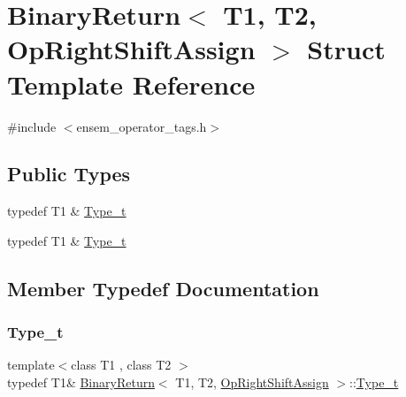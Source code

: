 \hypertarget{structBinaryReturn_3_01T1_00_01T2_00_01OpRightShiftAssign_01_4}{}\section{Binary\+Return$<$ T1, T2, Op\+Right\+Shift\+Assign $>$ Struct Template Reference}
\label{structBinaryReturn_3_01T1_00_01T2_00_01OpRightShiftAssign_01_4}


{\ttfamily \#include $<$ensem\+\_\+operator\+\_\+tags.\+h$>$}

\subsection*{Public Types}
\begin{DoxyCompactItemize}
\item 
typedef T1 \& \mbox{\hyperlink{structBinaryReturn_3_01T1_00_01T2_00_01OpRightShiftAssign_01_4_a4f80fa9e1ec9a2dfe91aa4777336c606}{Type\+\_\+t}}
\item 
typedef T1 \& \mbox{\hyperlink{structBinaryReturn_3_01T1_00_01T2_00_01OpRightShiftAssign_01_4_a4f80fa9e1ec9a2dfe91aa4777336c606}{Type\+\_\+t}}
\end{DoxyCompactItemize}


\subsection{Member Typedef Documentation}
\mbox{\label{structBinaryReturn_3_01T1_00_01T2_00_01OpRightShiftAssign_01_4_a4f80fa9e1ec9a2dfe91aa4777336c606}} 
\subsubsection{\texorpdfstring{Type\_t}{Type\_t}\hspace{0.1cm}{\footnotesize\ttfamily [1/2]}}
{\footnotesize\ttfamily template$<$class T1 , class T2 $>$ \\
typedef T1\& \mbox{\hyperlink{structBinaryReturn}{Binary\+Return}}$<$ T1, T2, \mbox{\hyperlink{structOpRightShiftAssign}{Op\+Right\+Shift\+Assign}} $>$\+::\mbox{\hyperlink{structBinaryReturn_3_01T1_00_01T2_00_01OpRightShiftAssign_01_4_a4f80fa9e1ec9a2dfe91aa4777336c606}{Type\+\_\+t}}}

